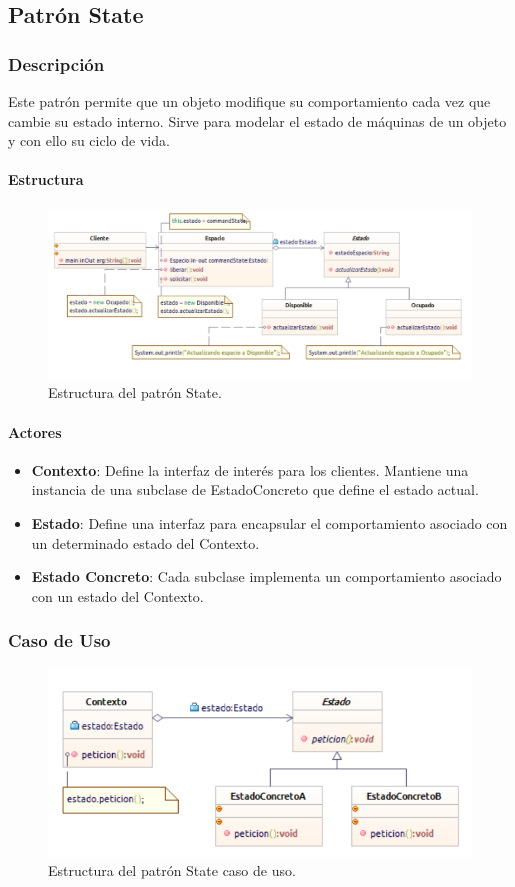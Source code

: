 \subsection{Patrón State}

\subsubsection{Descripción}
Este patrón permite que un objeto modifique su comportamiento cada vez que cambie su estado interno. Sirve para modelar el estado de máquinas de un objeto y con ello su ciclo de vida.

\paragraph{Estructura}

\begin{figure}[th!]
	\centering
	\includegraphics[width=.7\linewidth]{imagenes/Patrones/State.pdf}
	\caption{Estructura del patrón State.\cite{gof}}	
\end{figure}

\paragraph{Actores}

\begin{itemize}
	\item \textbf{Contexto}: Define la interfaz de interés para los clientes. Mantiene una instancia de una subclase de EstadoConcreto que define el estado actual.
	\item \textbf{Estado}: Define una interfaz para encapsular el comportamiento asociado con un determinado estado del Contexto.
	\item \textbf{Estado Concreto}: Cada subclase implementa un comportamiento asociado con un estado del Contexto.
\end{itemize}


\subsubsection{Caso de Uso}
\begin{figure}[th!]
	\centering
	\includegraphics[width=.7\linewidth]{imagenes/Patrones/State_caso.pdf}
	\caption{Estructura del patrón State caso de uso.\cite{gof}}	
\end{figure}

